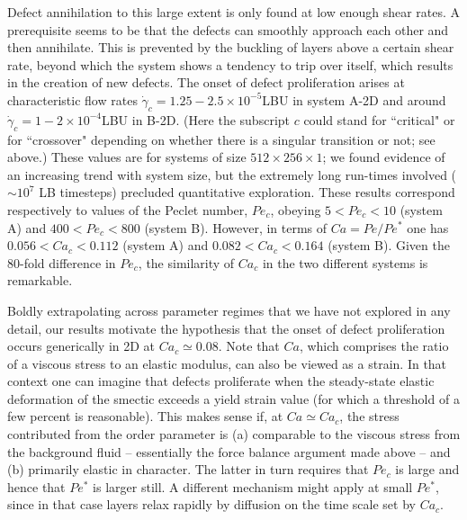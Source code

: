 \documentclass[8.5pt,twoside,twocolumn]{article}
\newcommand{\e}[1]{\times10^{#1}}
\begin{document}
Defect annihilation to this large extent is only found at low enough shear rates. A prerequisite seems to be that the defects can smoothly approach each other and then annihilate. This is prevented by the buckling of layers above a certain shear rate, beyond which the system shows a tendency to trip over itself, which results in the creation of new defects. The onset of defect proliferation arises at characteristic flow rates $\dot{\gamma}_c=1.25-2.5\e{-5}$LBU in system A-2D and around $\dot{\gamma}_c=1-2\e{-4}$LBU in B-2D. 
(Here the subscript $c$ could stand for ``critical" or for ``crossover" depending on whether there is a singular transition or not; see above.)
These values are for
systems of size $512\times256\times1$; we found evidence of an increasing trend with system size, but the extremely long run-times involved ($\sim 10^7$ LB timesteps) precluded quantitative exploration. These results correspond respectively to values of the Peclet number, $Pe_c$, obeying $5<Pe_c<10$ (system A) and $400<Pe_c<800$ (system B).  However, in terms of $Ca = Pe/Pe^*$ one has $0.056<Ca_c<0.112$ (system A) and $0.082<Ca_c<0.164$ (system B). Given the 80-fold difference in $Pe_c$, the similarity of $Ca_c$ in the two different systems is remarkable.

Boldly extrapolating across parameter regimes that we have not explored in any detail, our results motivate the hypothesis that the onset of defect proliferation occurs generically in 2D at $Ca_c\simeq 0.08$.  Note that $Ca$, which comprises the ratio of a viscous stress to an elastic modulus, can also be viewed as a strain. In that context one can imagine that defects proliferate when the steady-state elastic deformation of the smectic exceeds a yield strain value (for which a threshold of a few percent is reasonable). This makes sense if, at $Ca \simeq Ca_c$, the stress contributed from the order parameter is (a) comparable to the viscous stress from the background fluid -- essentially the force balance argument made above -- and (b) primarily elastic in character. The latter in turn requires that $Pe_c$ is large and hence that $Pe^*$ is larger still. A different mechanism might apply at small $Pe^*$, since in that case layers relax rapidly by diffusion on the time scale set by $Ca_c$.
\end{document}
